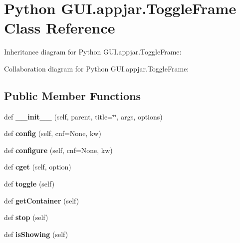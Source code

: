 \hypertarget{class_python_01_g_u_i_1_1appjar_1_1_toggle_frame}{}\section{Python G\+U\+I.\+appjar.\+Toggle\+Frame Class Reference}
\label{class_python_01_g_u_i_1_1appjar_1_1_toggle_frame}


Inheritance diagram for Python G\+U\+I.\+appjar.\+Toggle\+Frame\+:


Collaboration diagram for Python G\+U\+I.\+appjar.\+Toggle\+Frame\+:
\subsection*{Public Member Functions}
\begin{DoxyCompactItemize}
\item 
\mbox{\label{class_python_01_g_u_i_1_1appjar_1_1_toggle_frame_ac774ab7f0c038c00ff3193a706a979ed}} 
def {\bfseries \+\_\+\+\_\+init\+\_\+\+\_\+} (self, parent, title=\char`\"{}\char`\"{}, args, options)
\item 
\mbox{\label{class_python_01_g_u_i_1_1appjar_1_1_toggle_frame_afd75d19b9928c749f2d0afb97374cf06}} 
def {\bfseries config} (self, cnf=None, kw)
\item 
\mbox{\label{class_python_01_g_u_i_1_1appjar_1_1_toggle_frame_a5901187f25320a9304054b3dee0831bc}} 
def {\bfseries configure} (self, cnf=None, kw)
\item 
\mbox{\label{class_python_01_g_u_i_1_1appjar_1_1_toggle_frame_a2526a959b1ef60f721a684d548c783d5}} 
def {\bfseries cget} (self, option)
\item 
\mbox{\label{class_python_01_g_u_i_1_1appjar_1_1_toggle_frame_a8ed696368d9b3fa0210d2b3451363de0}} 
def {\bfseries toggle} (self)
\item 
\mbox{\label{class_python_01_g_u_i_1_1appjar_1_1_toggle_frame_ad3ff21bb4837c88c45016fcd3aff9ef1}} 
def {\bfseries get\+Container} (self)
\item 
\mbox{\label{class_python_01_g_u_i_1_1appjar_1_1_toggle_frame_ab4738a7b7cba1c52a4af999298a8b2e5}} 
def {\bfseries stop} (self)
\item 
\mbox{\label{class_python_01_g_u_i_1_1appjar_1_1_toggle_frame_a7de3442e3f82982870e7cf2c5004722e}} 
def {\bfseries is\+Showing} (self)
\end{DoxyCompactItemize}
